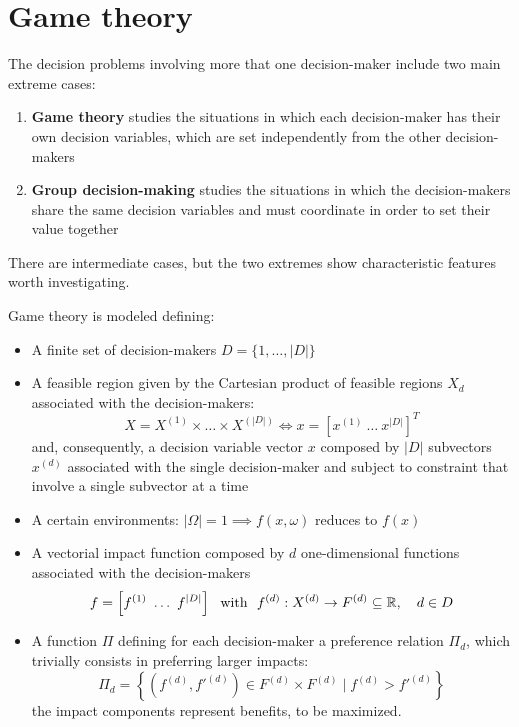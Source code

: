 \chapter{Game theory}
\label{ch:gt}

The decision problems involving more that one decision-maker include two main extreme cases:
\begin{enumerate}
	\item \textbf{Game theory} studies the situations in which each decision-maker has their own decision variables, which are set independently from the other decision-makers
	
	\item \textbf{Group decision-making} studies the situations in which the decision-makers share the same decision variables and must coordinate in order to set their value together
\end{enumerate}

There are intermediate cases, but the two extremes show characteristic features worth investigating.

Game theory is modeled defining: 
\begin{itemize}
	\item A finite set of decision-makers $D = \{1, \dots, |D|\}$
	
	\item A feasible region given by the Cartesian product of feasible regions $X_d$ associated with the decision-makers:
	$$ X = X^{(1)} \times \dots \times X^{(|D|)} \Leftrightarrow x = \left[x^{(1)} \ \dots \ x^{|D|}\right]^T $$
	and, consequently, a decision variable vector $x$ composed by $|D|$ subvectors $x^{(d)}$ associated with the single decision-maker and subject to constraint that involve a single subvector at a time
	
	\item A certain environments: $|\Omega| = 1 \implies f(x,\omega)$ reduces to $f(x)$
	
	\item A vectorial impact function composed by $d$ one-dimensional functions associated with the decision-makers
	$$ f = \left[f^{(1)} \ \dots \ f^{|D|}\right] \ \text{ with } \ f^{(d)}: X^{(d)} \rightarrow F^{(d)} \subseteq \R, \quad d \in D $$
	
	\item A function $\Pi$ defining for each decision-maker a preference relation $\Pi_d$, which trivially consists in preferring larger impacts:
	$$ \Pi_d = \left\{\left(f^{(d)}, f'^{(d)}\right) \in F^{(d)} \times F^{(d)} \mid f^{(d)} > f'^{(d)} \right\} $$
	the impact components represent benefits, to be maximized.
\end{itemize}

